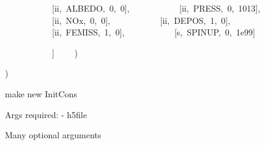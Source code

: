 {\begin{DoxyParamCaption}
{{~~~~~~~~~~~\mbox{[}\textquotesingle{}ii\textquotesingle{},~\textquotesingle{}ALBEDO\textquotesingle{},~\textquotesingle{}0\textquotesingle{},~\textquotesingle{}0\textquotesingle{}\mbox{]},
~~~~~~~~~~~\mbox{[}\textquotesingle{}ii\textquotesingle{},~\textquotesingle{}PRESS\textquotesingle{},~\textquotesingle{}0\textquotesingle{},~\textquotesingle{}1013\textquotesingle{}\mbox{]},
~~~~~~~~~~~\mbox{[}\textquotesingle{}ii\textquotesingle{},~\textquotesingle{}NOx\textquotesingle{},~\textquotesingle{}0\textquotesingle{},~\textquotesingle{}0\textquotesingle{}\mbox{]},
~~~~~~~~~~~\mbox{[}\textquotesingle{}ii\textquotesingle{},~\textquotesingle{}DEPOS\textquotesingle{},~\textquotesingle{}1\textquotesingle{},~\textquotesingle{}0\textquotesingle{}\mbox{]},
~~~~~~~~~~~\mbox{[}\textquotesingle{}ii\textquotesingle{},~\textquotesingle{}FEMISS\textquotesingle{},~\textquotesingle{}1\textquotesingle{},~\textquotesingle{}0\textquotesingle{}\mbox{]},
~~~~~~~~~~~\mbox{[}\textquotesingle{}s\textquotesingle{},~\textquotesingle{}SPINUP\textquotesingle{},~\textquotesingle{}0\textquotesingle{},~\textquotesingle{}1e99\textquotesingle{}\mbox{]}

~~~~~~~~~~~\mbox{]}
~~~~)} }\end{DoxyParamCaption})}

\begin{DoxyVerb}make new InitCons

Args required:
 - h5file

 Many optional arguments\end{DoxyVerb}
 
